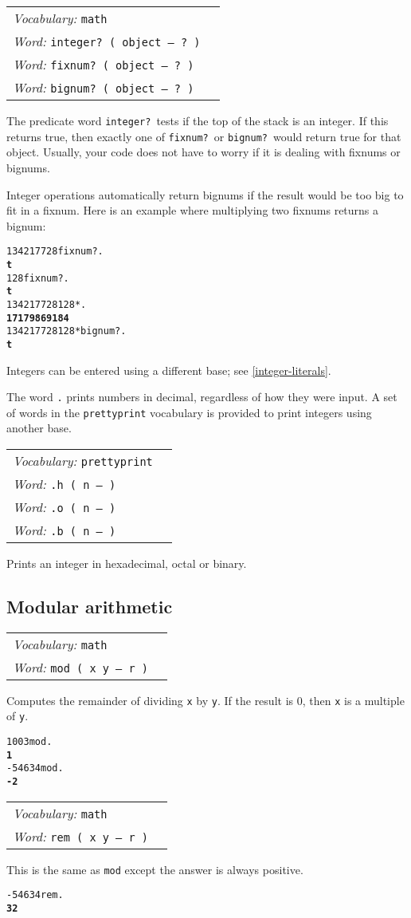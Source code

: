 \documentclass{book}
\newcommand{\vocabulary}[1]{\emph{Vocabulary:} \texttt{#1}&\\}
\newcommand{\ordinaryword}[2]{\index{\texttt{#1}}\emph{Word:} \texttt{#2}&\\}
\newcommand{\predword}[1]{\ordinaryword{#1}{#1~( object -- ?~)}}
\newcommand{\wordtable}[1]{


\begin{tabularx}{12cm}{lX}
\hline
#1
\hline
\end{tabularx}

}
\begin{document}
\wordtable{
\vocabulary{math}
\predword{integer?}
\predword{fixnum?}
\predword{bignum?}
}
The predicate word \texttt{integer?}~tests if the top of the stack is an integer. If this returns true, then exactly one of \texttt{fixnum?}~or \texttt{bignum?}~would return true for that object. Usually, your code does not have to worry if it is dealing with fixnums or bignums.

Integer operations automatically return bignums if the result would be too big to fit in a fixnum. Here is an example where multiplying two fixnums returns a bignum:

\begin{alltt}
  134217728 fixnum? .
\textbf{t}
  128 fixnum? .
\textbf{t}
  134217728 128 * .
\textbf{17179869184}
  134217728 128 * bignum? .
\textbf{t}
\end{alltt}

Integers can be entered using a different base; see \ref{integer-literals}.

The word \texttt{.} prints numbers in decimal, regardless of how they were input. A set of words in the \texttt{prettyprint} vocabulary is provided to print integers using another base.

\wordtable{
\vocabulary{prettyprint}
\ordinaryword{.h}{.h ( n -- )}
\ordinaryword{.o}{.o ( n -- )}
\ordinaryword{.b}{.b ( n -- )}

}
Prints an integer in hexadecimal, octal or binary.

\subsection{Modular arithmetic}

\wordtable{
\vocabulary{math}
\ordinaryword{mod}{mod ( x y -- r )}
}
Computes the remainder of dividing \texttt{x} by \texttt{y}. If the result is 0, then \texttt{x} is a multiple of \texttt{y}.
\begin{alltt}
  100 3 mod .
\textbf{1}
  -546 34 mod .
\textbf{-2}
\end{alltt}
\wordtable{
\vocabulary{math}
\ordinaryword{rem}{rem ( x y -- r )}
}
This is the same as \texttt{mod} except the answer is always positive.
\begin{alltt}
  -546 34 rem .
\textbf{32}
\end{alltt}
\end{document}

